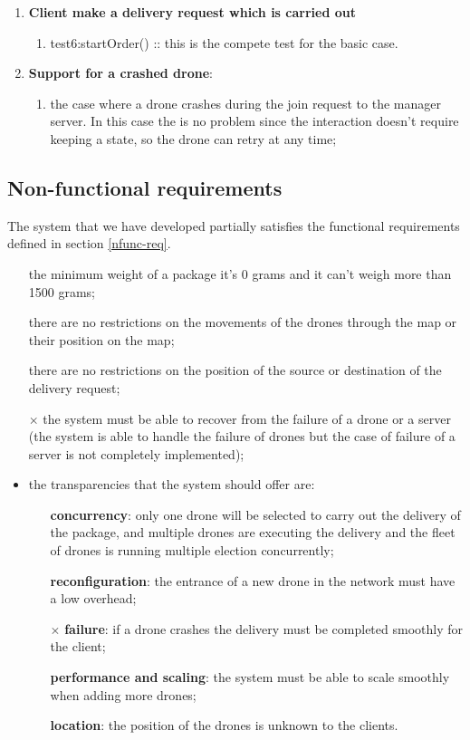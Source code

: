 \documentclass[a4paper, oneside]{memoir}
\begin{document}
\begin{enumerate}
\item \textbf{Client make a delivery request which is carried out}
	\begin{enumerate}
	\item \textsf{test6:startOrder()} :: this is the compete test for the basic case.
	\end{enumerate}

\item \textbf{Support for a crashed drone}:
	\begin{enumerate}
		\item the case where a drone crashes during the join request to the manager server. In this case the is no problem since the interaction doesn't require keeping a state, so the drone can retry at any time;
	\end{enumerate}

\end{enumerate}


\subsection{Non-functional requirements}
The system that we have developed partially satisfies the functional requirements defined in section \ref{nfunc-req}.

\begin{itemize}
\item[\checkmark] the minimum weight of a package it's 0 grams and it can't weigh more than 1500 grams;
\item[\checkmark] there are no restrictions on the movements of the drones through the map or their position on the map;
\item[\checkmark] there are no restrictions on the position of the source or destination of the delivery request;
\item[$\times$] the system must be able to recover from the failure of a drone or a server (the system is able to handle the failure of drones but the case of failure of a server is not completely implemented);

\item the transparencies that the system should offer are:
	\begin{itemize}
	\item[\checkmark] \textbf{concurrency}: only one drone will be selected to carry out the delivery of the package, and multiple drones are executing the delivery and the fleet of drones is running multiple election concurrently;
	\item[\checkmark] \textbf{reconfiguration}: the entrance of a new drone in the network must have a low overhead;
	\item[$\times$] \textbf{failure}: if a drone crashes the delivery must be completed smoothly for the client;
	\item[\checkmark] \textbf{performance and scaling}: the system must be able to scale smoothly when adding more drones;
	\item[\checkmark] \textbf{location}: the position of the drones is unknown to the clients.
	\end{itemize}
\end{itemize}
\end{document}
